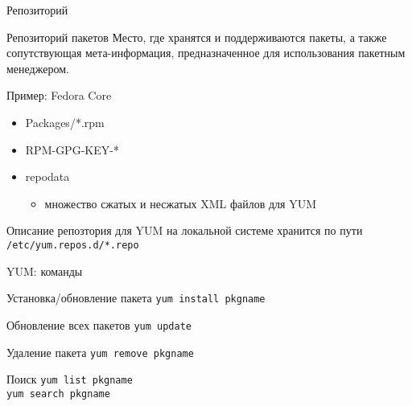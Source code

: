 
\begin{frame}{Репозиторий}
	\begin{block}{Репозиторий пакетов}
		Место, где хранятся и поддерживаются пакеты, а также сопутствующая мета-информация, предназначенное для использования пакетным менеджером.
	\end{block}
	\begin{block}{Пример: Fedora Core}
		\begin{itemize}
			\item Packages/*.rpm
			\item RPM-GPG-KEY-*
			\item repodata
			\begin{itemize}
				\item множество сжатых и несжатых XML файлов для YUM
			\end{itemize}
		\end{itemize}

		Описание репозтория для YUM на локальной системе хранится по пути
		{\tt /etc/yum.repos.d/*.repo}
	\end{block}
		
\end{frame}

\begin{frame}{YUM: команды}
	\begin{block}{Установка/обновление пакета}
		{\tt yum install pkgname }
	\end{block}
	\begin{block}{Обновление всех пакетов}
		{\tt yum update }
	\end{block}
	\begin{block}{Удаление пакета}
		{\tt yum remove pkgname }
	\end{block}
	\begin{block}{Поиск}
		{\tt yum list pkgname }\\
		{\tt yum search pkgname }
	\end{block}
\end{frame}


